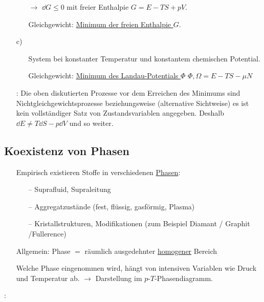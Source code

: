 \begin{itemize}[align=left]
\begin{itemize}[align=left]
    \item[$\rightarrow$] $\dd{G} \leq 0$ mit freier Enthalpie $G = E - TS + pV$.
    \item[Gleichgewicht:] \uline{Minimum der freien Enthalpie $G$}.
  \end{itemize}
  \item[c)] \begin{itemize}[align=left]
    \item[System] bei konstanter Temperatur und konstantem chemischen Potential.
    \item[Gleichgewicht:] \uline{Minimum des Landau-Potentials $\Phi$} $\Phi, \Omega = E - TS - \mu N$
  \end{itemize}
  \item[\uwave{Beachte}:] Die oben diskutierten Prozesse vor dem Erreichen des Minimums sind Nichtgleichgewichtsprozesse beziehungsweise (alternative Sichtweise) es ist kein vollständiger Satz von Zustandsvariablen angegeben. Deshalb $\dd{E} \neq T\dd{S} - p\dd{V}$ und so weiter.
\end{itemize}

\subsection{Koexistenz von Phasen}

\begin{itemize}[align=left]
  \item[Empirisch existieren Stoffe in verschiedenen \uline{Phasen}:] \begin{itemize}[align=left]
    \item[--] Suprafluid, Supraleitung
    \item[--] Aggregatzustände (fest, flüssig, gasförmig, Plasma)
    \item[--] Kristallstrukturen, Modifikationen (zum Beispiel Diamant / Graphit /Fullerence)
  \end{itemize}
  \item[Allgemein:] Phase $=$ räumlich ausgedehnter \uline{homogener} Bereich
  \item[Welche] Phase eingenommen wird, hängt von intensiven Variablen wie Druck und Temperatur ab. $\rightarrow$ Darstellung im $p$-$T$-Phasendiagramm.
\end{itemize}

:
\begin{figure}[H]
  \centering
 
\end{figure}
\begin{figure}[H]
  \centering
 
\end{figure}
\begin{figure}[H]
  \centering
 
\end{figure}

